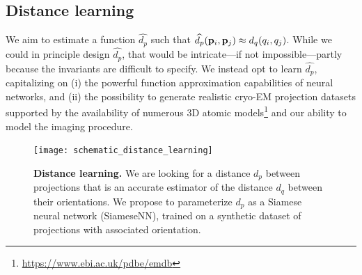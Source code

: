 \subsection{Distance learning}\label{sec:method:distance-learning}


We aim to estimate a function $\widehat{d_p}$ such that $\widehat{d_p}(\mathbf{p}_i, \mathbf{p}_j) \approx d_q(q_i, q_j)$.
While we could in principle design $\widehat{d_p}$, that would be intricate---if not impossible---partly because the invariants are difficult to specify.
We instead opt to learn $\widehat{d_p}$, capitalizing on (i) the powerful function approximation capabilities of neural networks, and (ii) the possibility to generate realistic cryo-EM projection datasets supported by the availability of numerous 3D atomic models\footnote{\url{https://www.ebi.ac.uk/pdbe/emdb}} and our ability to model the imaging procedure.

\begin{figure}
    \centering
    \texttt{[image: schematic\_distance\_learning]}
    \caption{%
        \textbf{Distance learning.}
        We are looking for a distance $d_p$ between projections that is an accurate estimator of the distance $d_q$ between their orientations.
        We propose to parameterize $d_p$ as a Siamese neural network (SiameseNN), trained on a synthetic dataset of projections with associated orientation.
}\label{fig:schematic:distance-learning}
\end{figure}

